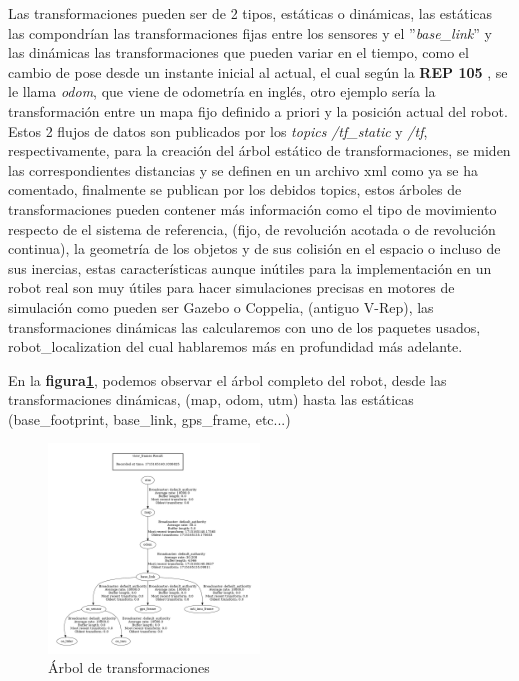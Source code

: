 Las transformaciones pueden ser de 2 tipos, estáticas o dinámicas, las estáticas las compondrían las transformaciones fijas entre los 
sensores y el ''\textit{base\_link}'' y las dinámicas las transformaciones que pueden variar en el tiempo, como el cambio de pose desde 
un instante inicial al actual, el cual según la \textbf{REP 105} , se le llama \textit{odom}, que viene de odometría en inglés, otro 
ejemplo sería la transformación entre un mapa fijo definido a priori y la posición actual del robot. Estos 2 flujos de datos son publicados 
por los \textit{topics} \textit{/tf\_static} y \textit{/tf}, respectivamente, para la creación del árbol estático de transformaciones, se 
miden las correspondientes distancias y se definen en un archivo xml como ya se ha comentado, finalmente se publican por los debidos topics, 
estos árboles de transformaciones pueden contener más información como el tipo de movimiento respecto de el sistema de referencia, 
(fijo, de revolución acotada o de revolución continua), la geometría de los objetos y de sus colisión en el espacio o incluso de sus 
inercias, estas características aunque inútiles para la implementación en un robot real son muy útiles para hacer simulaciones precisas 
en motores de simulación como pueden ser Gazebo o Coppelia, (antiguo V-Rep), las transformaciones dinámicas las calcularemos con uno de 
los paquetes usados, robot\_localization del cual hablaremos más en profundidad más adelante.

En la  \textbf{figura\ref{fig:arbol_urdf}}, podemos observar el árbol completo del robot, desde las transformaciones dinámicas, 
(map, odom, utm) hasta las estáticas (base\_footprint, base\_link, gps\_frame, etc...)

\begin{figure}[H]
    \centering
    \includegraphics[width=0.5\textwidth]{images/arbol_transformaciones_hunter.jpg}
    \caption{Árbol de transformaciones}
    \label{fig:arbol_urdf}
\end{figure}

